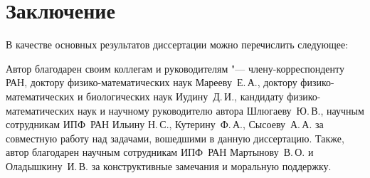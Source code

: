 \chapter*{Заключение}                       %


В качестве основных результатов диссертации можно перечислить следующее:


Автор благодарен своим коллегам и руководителям "--- члену-корреспонденту РАН, доктору физико-математических наук Марееву~Е.\,А., доктору физико-математических и биологических наук Иудину~Д.\,И., кандидату физико-математических наук и научному руководителю автора Шлюгаеву~Ю.\,В., научным сотрудникам ИПФ~РАН Ильину Н.\,С., Кутерину~Ф.\,А., Сысоеву~А.\,А. за совместную работу над задачами, вошедшими в данную диссертацию. Также, автор благодарен научным сотрудникам ИПФ~РАН Мартынову~В.\,О. и Оладышкину~И.\,В. за конструктивные замечания и моральную поддержку.